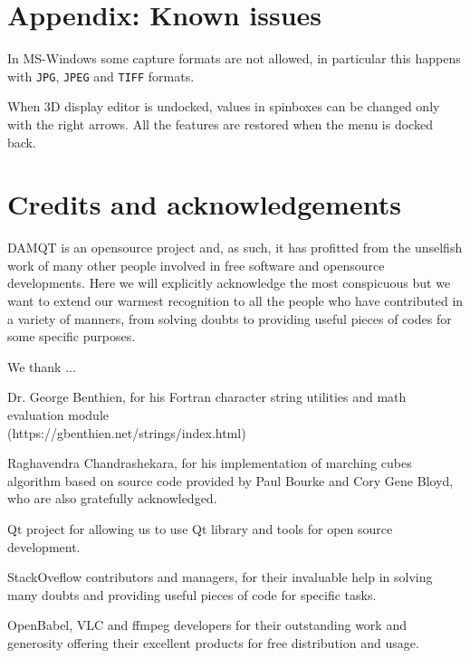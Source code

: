 \documentclass[10pt]{article}
\begin{document}
\section{Appendix: Known issues\label{A7}}

In MS-Windows some capture formats are not allowed, in particular this happens with \texttt{JPG}, \texttt{JPEG} and \texttt{TIFF} formats.

When 3D display editor is undocked, values in spinboxes can be changed only with the right arrows. All the features are 
restored when the menu is docked back.

\section*{Credits and acknowledgements}

DAMQT is an opensource project and, as such, it has profitted from the 
unselfish work of many other people involved in free software and opensource developments.
Here we will explicitly acknowledge the most conspicuous but we want to extend our warmest
recognition to all the people who have contributed in a variety of manners, from solving doubts
to providing useful pieces of codes for some specific purposes.

We thank ...

Dr. George Benthien, for his Fortran character string utilities and math evaluation module \\
(https://gbenthien.net/strings/index.html)

Raghavendra Chandrashekara, for his implementation of marching cubes algorithm
based on source code provided by Paul Bourke and Cory Gene Bloyd, 
who are also gratefully acknowledged.

Qt project for allowing us to use Qt library and tools for open source development.

StackOveflow contributors and managers, for their invaluable help in solving many doubts 
and providing useful pieces of code for specific tasks.

OpenBabel, VLC and ffmpeg developers for their outstanding work and generosity offering
their excellent products for free distribution and usage.


\newpage

\listoffigures

\printindex
\end{document}
